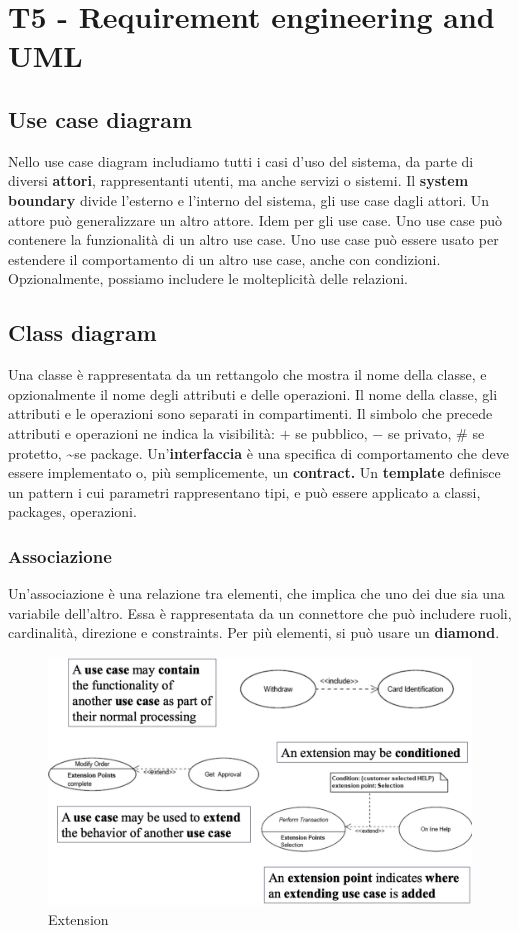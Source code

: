 \documentclass[11pt]{article}
\begin{document}
\section{T5 - Requirement engineering and UML}
\subsection{Use case diagram}
Nello use case diagram includiamo tutti i casi d'uso del sistema, da parte di diversi \textbf{attori}, rappresentanti utenti, ma anche servizi o sistemi. Il \textbf{system boundary} divide l'esterno e l'interno del sistema, gli use case dagli attori. Un attore può generalizzare un altro attore. Idem per gli use case. Uno use case può contenere la funzionalità di un altro use case. Uno use case può essere usato per estendere il comportamento di un altro use case, anche con condizioni. Opzionalmente, possiamo includere le molteplicità delle relazioni. 
\subsection{Class diagram}
Una classe è rappresentata da un rettangolo che mostra il nome della classe, e opzionalmente il nome degli attributi e delle operazioni. Il nome della classe, gli attributi e le operazioni sono separati in compartimenti. Il simbolo che precede attributi e operazioni ne indica la visibilità: $+$ se pubblico, $-$ se privato, $\#$ se protetto, \textasciitilde se package. Un'\textbf{interfaccia} è una specifica di comportamento che deve essere implementato o, più semplicemente, un \textbf{contract.} Un \textbf{template} definisce un pattern i cui parametri rappresentano tipi, e può essere applicato a classi, packages, operazioni. 
\subsubsection{Associazione}
Un'associazione è una relazione tra elementi, che implica che uno dei due sia una variabile dell'altro. Essa è rappresentata da un connettore che può includere ruoli, cardinalità, direzione e \glspl{constraint}. Per più elementi, si può usare un \textbf{diamond}. 
\begin{figure}[H]
    \centering
    \includegraphics[width=0.6\linewidth]{res/teoria/Extension.png}
    \caption{Extension}
\end{figure}
\end{document}
